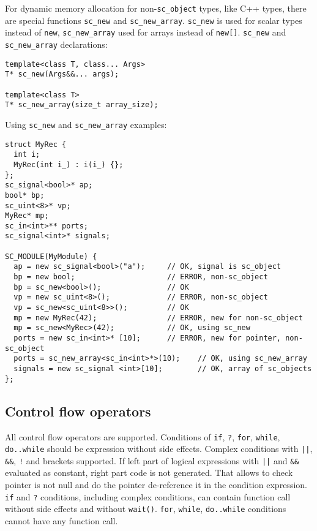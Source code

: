 For dynamic memory allocation for non-{\tt sc\_object} types, like C++ types, there are special functions {\tt sc\_new} and {\tt sc\_new\_array}. {\tt sc\_new} is used for scalar types instead of {\tt new}, {\tt sc\_new\_array} used for arrays instead of {\tt new[]}. {\tt sc\_new} and {\tt sc\_new\_array} declarations:
%
\begin{lstlisting}[style=mycpp]
template<class T, class... Args>
T* sc_new(Args&&... args);
 
template<class T>
T* sc_new_array(size_t array_size);
\end{lstlisting}

Using {\tt sc\_new} and {\tt sc\_new\_array} examples:
% 
\begin{lstlisting}[style=mycpp]
struct MyRec {
  int i;
  MyRec(int i_) : i(i_) {};
};
sc_signal<bool>* ap;
bool* bp;
sc_uint<8>* vp;
MyRec* mp;
sc_in<int>** ports;
sc_signal<int>* signals;
   
SC_MODULE(MyModule) {
  ap = new sc_signal<bool>("a");     // OK, signal is sc_object
  bp = new bool;                     // ERROR, non-sc_object
  bp = sc_new<bool>();               // OK
  vp = new sc_uint<8>();             // ERROR, non-sc_object
  vp = sc_new<sc_uint<8>>();         // OK
  mp = new MyRec(42);                // ERROR, new for non-sc_object
  mp = sc_new<MyRec>(42);            // OK, using sc_new
  ports = new sc_in<int>* [10];      // ERROR, new for pointer, non-sc_object 
  ports = sc_new_array<sc_in<int>*>(10);    // OK, using sc_new_array
  signals = new sc_signal <int>[10];        // OK, array of sc_objects 
};
\end{lstlisting}


\subsection{Control flow operators}

All control flow operators are supported. 
Conditions of {\tt if}, {\tt ?}, {\tt for}, {\tt while}, {\tt do..while} should be expression without side effects. Complex conditions with {\tt ||}, {\tt \&\&}, {\tt !} and brackets supported. If left part of logical expressions with {\tt ||} and {\tt \&\&} evaluated as constant, right part code is not generated. 
%
That allows to check pointer is not null and do the pointer de-reference it in the condition expression. {\tt if} and {\tt ?} conditions, including complex conditions, can contain function call without side effects and without {\tt wait()}. {\tt for}, {\tt while}, {\tt do..while} conditions cannot have any function call.

